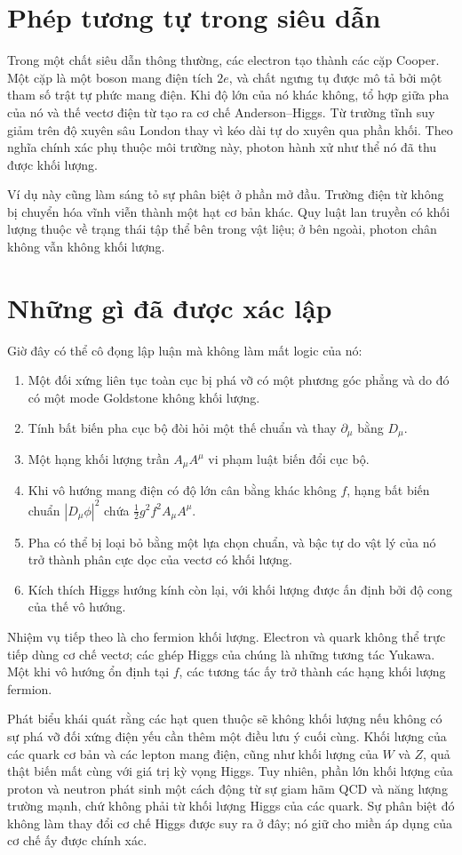 \section{Phép tương tự trong siêu dẫn}

Trong một chất siêu dẫn thông thường, các electron tạo thành các cặp Cooper. Một cặp là một
boson mang điện tích \(2e\), và chất ngưng tụ được mô tả bởi một
tham số trật tự phức mang điện. Khi độ lớn của nó khác không,
tổ hợp giữa pha của nó và thế vectơ điện từ tạo ra
cơ chế Anderson--Higgs. Từ trường tĩnh suy giảm trên độ xuyên sâu London
thay vì kéo dài tự do xuyên qua phần khối. Theo nghĩa chính xác phụ thuộc môi trường này,
photon hành xử như thể nó đã thu được khối lượng.

Ví dụ này cũng làm sáng tỏ sự phân biệt ở phần mở đầu. Trường điện từ
không bị chuyển hóa vĩnh viễn thành một hạt cơ bản khác.
Quy luật lan truyền có khối lượng thuộc về trạng thái tập thể bên trong vật liệu;
ở bên ngoài, photon chân không vẫn không khối lượng.

\section{Những gì đã được xác lập}

Giờ đây có thể cô đọng lập luận mà không làm mất logic của nó:
\begin{enumerate}
  \item Một đối xứng liên tục toàn cục bị phá vỡ có một phương góc phẳng và
        do đó có một mode Goldstone không khối lượng.
  \item Tính bất biến pha cục bộ đòi hỏi một thế chuẩn và thay
        \(\partial_\mu\) bằng \(D_\mu\).
  \item Một hạng khối lượng trần \(A_\mu A^\mu\) vi phạm luật biến đổi cục bộ.
  \item Khi vô hướng mang điện có độ lớn cân bằng khác không \(f\), hạng
        bất biến chuẩn \(|D_\mu\phi|^2\) chứa
        \(\frac12g^2f^2A_\mu A^\mu\).
  \item Pha có thể bị loại bỏ bằng một lựa chọn chuẩn, và bậc tự do vật lý
        của nó trở thành phân cực dọc của vectơ có khối lượng.
  \item Kích thích Higgs hướng kính còn lại, với khối lượng được ấn định bởi độ cong
        của thế vô hướng.
\end{enumerate}

Nhiệm vụ tiếp theo là cho fermion khối lượng. Electron và quark không thể
trực tiếp dùng cơ chế vectơ; các ghép Higgs của chúng là những
tương tác Yukawa. Một khi vô hướng ổn định tại \(f\), các tương tác ấy trở thành
các hạng khối lượng fermion.

Phát biểu khái quát rằng các hạt quen thuộc sẽ không khối lượng nếu không có
sự phá vỡ đối xứng điện yếu cần thêm một điều lưu ý cuối cùng. Khối lượng
của các quark cơ bản và các lepton mang điện, cũng như khối lượng của \(W\) và \(Z\),
quả thật biến mất cùng với giá trị kỳ vọng Higgs. Tuy nhiên, phần lớn khối lượng của proton và neutron
phát sinh một cách động từ sự giam hãm QCD và năng lượng trường mạnh, chứ không phải từ khối lượng Higgs của các quark. Sự phân biệt đó không
làm thay đổi cơ chế Higgs được suy ra ở đây; nó giữ cho miền áp dụng của cơ chế ấy được chính xác.
